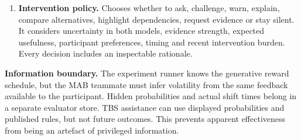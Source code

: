 \documentclass[11pt,a4paper]{article}
\begin{document}
\begin{enumerate}
\item \textbf{Intervention policy.} Chooses whether to ask, challenge, warn, explain, compare alternatives, highlight dependencies, request evidence or stay silent. It considers uncertainty in both models, evidence strength, expected usefulness, participant preferences, timing and recent intervention burden. Every decision includes an inspectable rationale.
\end{enumerate}

\textbf{Information boundary.} The experiment runner knows the generative reward schedule, but the MAB teammate must infer volatility from the same feedback available to the participant. Hidden probabilities and actual shift times belong in a separate evaluator store. TBS assistance can use displayed probabilities and published rules, but not future outcomes. This prevents apparent effectiveness from being an artefact of privileged information.
\end{document}
